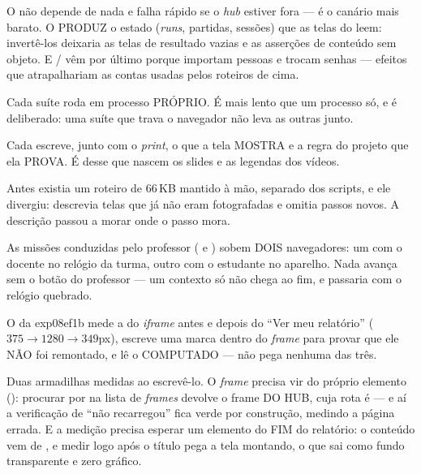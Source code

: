 \begin{nota}[title={NOTA --- a ordem dos papéis não é alfabética}]
O  não depende de nada e falha rápido se o \emph{hub} estiver fora
--- é o canário mais barato. O  PRODUZ o estado (\emph{runs},
partidas, sessões) que as telas do  leem: invertê-los deixaria as
telas de resultado vazias e as asserções de conteúdo sem objeto. E
/ vêm por último porque importam pessoas e trocam
senhas --- efeitos que atrapalhariam as contas usadas pelos roteiros de cima.

Cada suíte roda em processo PRÓPRIO. É mais lento que um processo só, e é
deliberado: uma suíte que trava o navegador não leva as outras junto.
\end{nota}

\begin{nota}[title={NOTA --- o manifesto é a fonte do deck e dos vídeos}]
Cada  escreve, junto com o \emph{print}, o que a tela MOSTRA e a
regra do projeto que ela PROVA. É desse  que nascem os slides e
as legendas dos vídeos.

Antes existia um roteiro de 66\,KB mantido à mão, separado dos scripts, e ele
divergiu: descrevia telas que já não eram fotografadas e omitia passos novos. A
descrição passou a morar onde o passo mora.
\end{nota}

\begin{nota}[title={NOTA --- os roteiros de DOIS contextos}]
As missões conduzidas pelo professor ( e
) sobem DOIS navegadores: um com o docente no
relógio da turma, outro com o estudante no aparelho. Nada avança sem o botão do
professor --- um contexto só não chega ao fim, e passaria com o relógio quebrado.

O da exp08ef1b mede a  do \emph{iframe} antes e depois do
\enquote{Ver meu relatório} ($375 \rightarrow 1280 \rightarrow 349$px), escreve
uma marca dentro do \emph{frame} para provar que ele NÃO foi remontado, e lê o
 COMPUTADO ---  não pega nenhuma das três.

Duas armadilhas medidas ao escrevê-lo. O \emph{frame} precisa vir do próprio
elemento (): procurar por  na
lista de \emph{frames} devolve o frame DO HUB, cuja rota é
 --- e aí a verificação de \enquote{não
recarregou} fica verde por construção, medindo a página errada. E a medição
precisa esperar um elemento do FIM do relatório: o conteúdo vem de
, e medir logo após o título pega a tela montando, o que sai como
fundo transparente e zero gráfico.
\end{nota}


